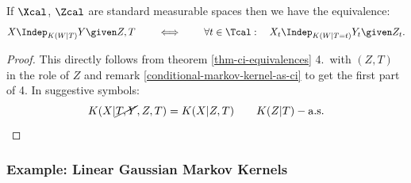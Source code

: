 \begin{Cor}
If $\Xcal$, $\Zcal$ are standard measurable spaces
then we have the equivalence:
\[ X \Indep_{K(W|T)} Y \given Z,T \qquad \iff \qquad \forall t \in \Tcal:\quad X_t \Indep_{K(W|T=t)} Y_t \given Z_t.\]
\begin{proof}
    This directly follows from theorem \ref{thm-ci-equivalences} 4.\ with $(Z,T)$ in the role of $Z$ 
    and remark \ref{conditional-markov-kernel-as-ci} to get the first part of 4.
    In suggestive symbols:
    \[ K(X|\cancel{T,Y},Z,T) = K(X|Z,T) \qquad K(Z|T)-\text{a.s.}\]
\end{proof}
\end{Cor}

\subsubsection{Example: Linear Gaussian Markov Kernels}

